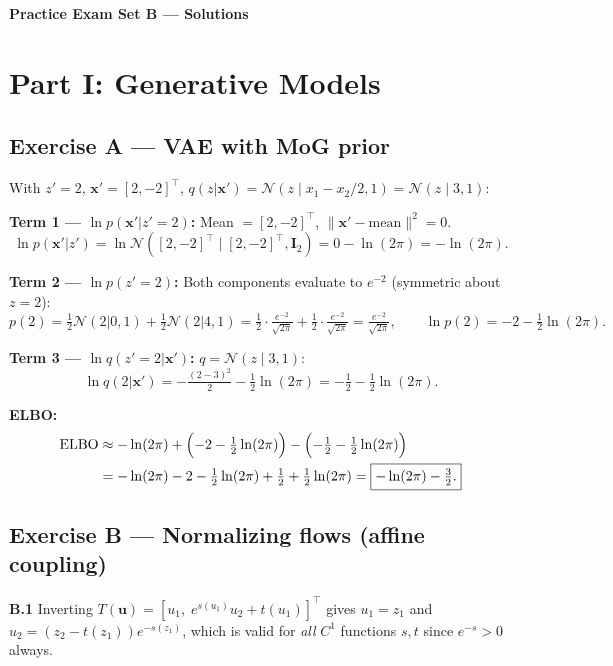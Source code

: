 \documentclass[12pt,a4paper]{article}
\newcommand{\N}{\mathcal{N}}
\newcommand{\ELBO}{\mathrm{ELBO}}
\newcommand{\ans}[1]{\tcbox[colback=yellow!20,colframe=orange!60,size=small]{\textbf{#1}}}
\begin{document}
\begin{center}
{\large\bfseries Practice Exam Set B --- Solutions}
\end{center}

\section*{Part I: Generative Models}

\subsection*{Exercise A --- VAE with MoG prior \hfill \ans{Answer: A}}

With $z'=2$, $\mathbf{x}'=[2,-2]^\top$, $q(z|\mathbf{x}')=\N(z\mid x_1-x_2/2,1)=\N(z\mid 3,1)$:

\textbf{Term 1 --- $\ln p(\mathbf{x}'|z'=2)$:} Mean $=[2,-2]^\top$, $\|\mathbf{x}'-\text{mean}\|^2=0$.
\[
  \ln p(\mathbf{x}'|z')=\ln\N([2,-2]^\top\mid[2,-2]^\top,\mathbf{I}_2)=0-\ln(2\pi)=-\ln(2\pi).
\]

\textbf{Term 2 --- $\ln p(z'=2)$:} Both components evaluate to $e^{-2}$ (symmetric about $z=2$):
\[
  p(2)=\tfrac{1}{2}\N(2|0,1)+\tfrac{1}{2}\N(2|4,1)
       =\tfrac{1}{2}\cdot\tfrac{e^{-2}}{\sqrt{2\pi}}+\tfrac{1}{2}\cdot\tfrac{e^{-2}}{\sqrt{2\pi}}
       =\tfrac{e^{-2}}{\sqrt{2\pi}},
  \qquad
  \ln p(2)=-2-\tfrac{1}{2}\ln(2\pi).
\]

\textbf{Term 3 --- $\ln q(z'=2|\mathbf{x}')$:} $q=\N(z\mid 3,1)$:
\[
  \ln q(2|\mathbf{x}')=-\tfrac{(2-3)^2}{2}-\tfrac{1}{2}\ln(2\pi)=-\tfrac{1}{2}-\tfrac{1}{2}\ln(2\pi).
\]

\textbf{ELBO:}
\begin{align*}
  \ELBO &\approx -\ln(2\pi)+\Bigl(-2-\tfrac{1}{2}\ln(2\pi)\Bigr)-\Bigl(-\tfrac{1}{2}-\tfrac{1}{2}\ln(2\pi)\Bigr)\\
        &= -\ln(2\pi)-2-\tfrac{1}{2}\ln(2\pi)+\tfrac{1}{2}+\tfrac{1}{2}\ln(2\pi)
         =\boxed{-\ln(2\pi)-\tfrac{3}{2}.}
\end{align*}

\subsection*{Exercise B --- Normalizing flows (affine coupling)}

\textbf{B.1 \hfill \ans{Answer: C}}
Inverting $T(\mathbf{u})=[u_1,\;e^{s(u_1)}u_2+t(u_1)]^\top$ gives $u_1=z_1$ and
$u_2=(z_2-t(z_1))e^{-s(z_1)}$, which is valid for \emph{all} $C^1$ functions $s,t$ since
$e^{-s}>0$ always.
\end{document}
